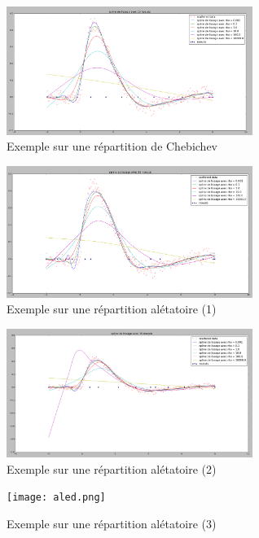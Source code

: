 \documentclass[a4paper,12pt]{article} %
\begin{document}
\begin{figure}
\begin{center}
\includegraphics[width=8cm]{Cheb.png} 
\end{center}
\caption{Exemple sur une répartition de Chebichev}
\label{cheb}
\end{figure}

\begin{figure}
\begin{center}
\includegraphics[width=8cm]{normal.png} 
\end{center}
\caption{Exemple sur une répartition alétatoire (1)}
\label{normal}
\end{figure}


\begin{figure}
\begin{center}
\includegraphics[width=8cm]{euh.png} 
\end{center}
\caption{Exemple sur une répartition alétatoire (2)}
\label{euh}
\end{figure}

\begin{figure}
\begin{center}
\texttt{[image: aled.png]} 
\end{center}
\caption{Exemple sur une  répartition alétatoire (3)}
\label{aled}
\end{figure}
\end{document}
